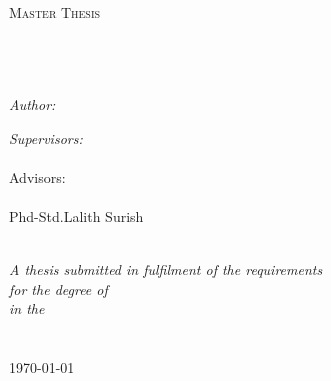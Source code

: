\documentclass[11pt, a4paper, oneside]{Thesis} %
\begin{document}
\begin{titlepage}
\begin{center}

\textsc{\LARGE \univname}\\[1.5cm] %
\textsc{\Large Master Thesis}\\[0.5cm] %

\HRule \\[0.4cm] %
{\huge \bfseries \ttitle}\\[0.4cm] %
\HRule \\[1.5cm] %
 
\begin{minipage}{0.4\textwidth}
\begin{flushleft} \large
\emph{Author:}\\
{\authornames} %
\end{flushleft}
\end{minipage}
\begin{minipage}{0.3\textwidth}
\begin{flushleft} \large
\emph{Supervisors:} \\
{\supname}\\ 

 Advisors:\\ %
{\examname}\\
Phd-Std.Lalith Surish 
 
\end{flushleft}
\end{minipage}\\[3cm]
 
\large \textit{A thesis submitted in fulfilment of the requirements\\ for the degree of \degreename}\\[0.3cm] %
\textit{in the}\\[0.4cm]
\groupname\\\deptname\\[2cm] %
 
{\large \today}\\[4cm] %
 
\vfill
\end{center}

\end{titlepage}
\end{document}
